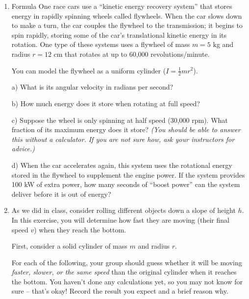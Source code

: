 \documentclass[12pt]{article}
\begin{document}
\Large
\centerline{}
\normalsize
\centerline{}


\begin{enumerate}

\item {Formula One race cars use a ``kinetic energy recovery system'' that stores energy in rapidly spinning wheels called flywheels. When the car slows down to make a turn, the car couples the flywheel to the transmission; it begins to spin rapidly, storing some of the car's translational kinetic energy in its rotation. One type of these systems uses a flywheel of mass $m=5$ kg and radius $r=12$ cm that rotates at up to 60,000 revolutions/minute.

You can model the flywheel as a uniform cylinder ($I=\frac{1}{2}mr^2$).


a) What is its angular velocity in radians per second?

\vspace{2in}

b) How much energy does it store when rotating at full speed?

\vspace{2in}

c) Suppose the wheel is only spinning at half speed (30,000 rpm). What fraction of its maximum energy does it store? \textit{(You should be able to answer this without a calculator. If you are not sure how, ask your instructors for advice.)}

\vspace{0.5in}

d) When the car accelerates again, this system uses the rotational energy stored in the flywheel to supplement the engine power. If the system provides 100 kW of extra power, how many seconds of ``boost power'' can the system deliver before it is out of energy?
}



\newpage

\item {

As we did in class, consider rolling different objects down a slope of height $h$. In this exercise, you will determine how fast they are moving (their final speed $v$) when they reach the bottom.

First, consider a solid cylinder of mass $m$ and radius $r$. 

For each of the following, your group should guess whether it will be moving \textit{faster, slower, or the same speed} than the original cylinder when it reaches the bottom. You haven't done any calculations yet, so you may not know for sure -- that's okay! Record the result you expect and a brief reason why.

}
\end{enumerate}
\end{document}
